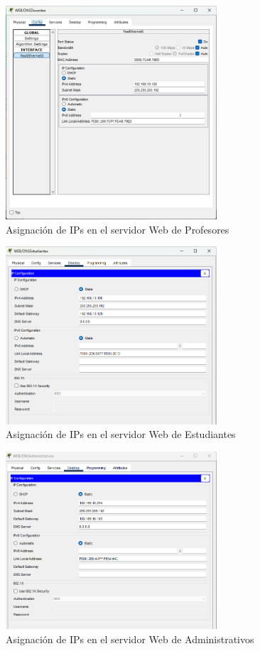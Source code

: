     \begin{figure}[H]
        \centering
        \includegraphics[width=0.7\textwidth]{img/serverprofesores.png}
        \caption{Asignación de IPs en el servidor Web de Profesores}
        \label{fig:serIP}
    \end{figure}
    \begin{figure}[H]
        \centering
        \includegraphics[width=0.7\textwidth]{img/serverestudiantes.png}
        \caption{Asignación de IPs en el servidor Web de Estudiantes}
        \label{fig:seresIP}
    \end{figure}
    \begin{figure}[H]
        \centering
        \includegraphics[width=0.7\textwidth]{img/serveradmin.png}
        \caption{Asignación de IPs en el servidor Web de Administrativos}
        \label{fig:seradIP}
    \end{figure}

